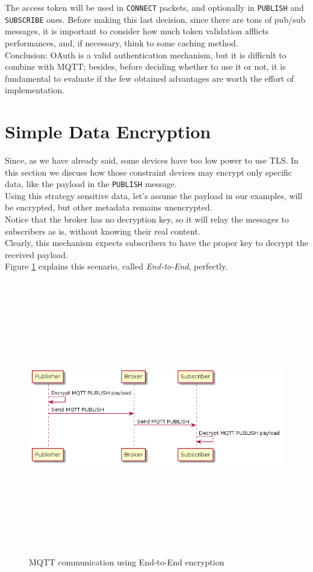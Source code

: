 \documentclass[12pt]{report}
\begin{document}
{{The access token will be used in \texttt{CONNECT} packets, and optionally in \texttt{PUBLISH} and \texttt{SUBSCRIBE} ones. Before making this last decision, since there are tons of pub/sub messages, it is important to consider how much token validation afflicts performances, and, if necessary, think to some caching method.\\

Conclusion: OAuth is a valid authentication mechanism, but it is difficult to combine with MQTT; besides, before deciding whether to use it or not, it is fundamental to evaluate if the few obtained advantages are worth the effort of implementation.


\section{Simple Data Encryption}
\bigskip
Since, as we have already said, some devices have too low power to use TLS.
In this section we discuss how those constraint devices may encrypt only specific data, like the payload in the \texttt{PUBLISH} message.\\

Using this strategy sensitive data, let's assume the payload in our examples, will be encrypted, but other metadata remains unencrypted.\\
Notice that the broker has no decryption key, so it will relay the messages to subscribers as is, without knowing their real content.\\
Clearly, this mechanism expects subscribers to have the proper key to decrypt the received payload.\\

Figure \ref{fig:endtoend} explains this scenario, called \emph{End-to-End}, perfectly.

\begin{figure}[H]
\includegraphics[width=12.5cm,height=12cm,keepaspectratio]{end_to_end}
\centering
\caption{MQTT communication using End-to-End encryption}
\label{fig:endtoend}
\end{figure}

}}
\end{document}
